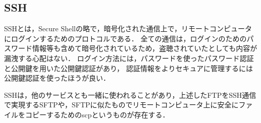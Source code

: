 \subsection{SSH}
SSHとは，Secure Shellの略で，暗号化された通信上で，リモートコンピュータにログインするためのプロトコルである．
全ての通信は，ログインのためのパスワード情報等も含めて暗号化されているため，盗聴されていたとしても内容が漏洩する心配はない．
ログイン方法には，パスワードを使ったパスワード認証と公開鍵を用いた公開鍵認証があり，
認証情報をよりセキュアに管理するには公開鍵認証を使ったほうが良い．

SSHは，他のサービスとも一緒に使われることがあり，上述したFTPをSSH通信で実現するSFTPや，SFTPに似たものでリモートコンピュータ上に安全にファイルをコピーするためのscpというものが存在する．

